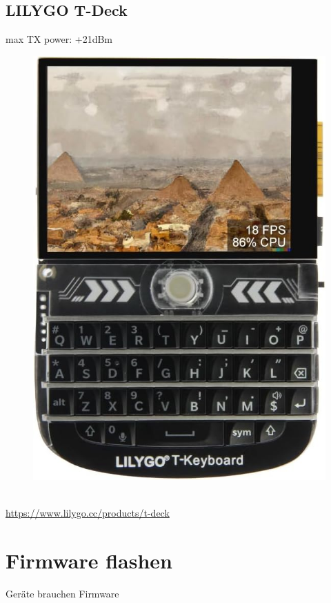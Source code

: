 \documentclass[12pt,a4paper]{article}
\begin{document}
\subsection{LILYGO T-Deck}
max TX power: +21dBm\\
\begin{figure}[h]
	\includegraphics[scale=0.1]{./Bilder/Devices/t-deck.jpg}
\end{figure}\\
\url{https://www.lilygo.cc/products/t-deck}
\newpage
\section{Firmware flashen}
Geräte brauchen Firmware
\end{document}
